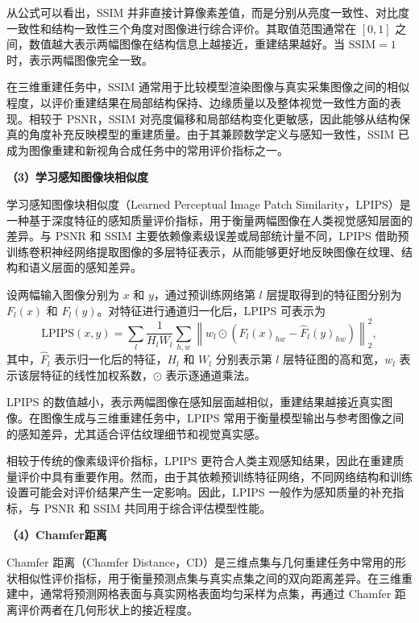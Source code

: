 从公式可以看出，SSIM 并非直接计算像素差值，而是分别从亮度一致性、对比度一致性和结构一致性三个角度对图像进行综合评价。其取值范围通常在 $[0,1]$ 之间，数值越大表示两幅图像在结构信息上越接近，重建结果越好。当 $\mathrm{SSIM}=1$ 时，表示两幅图像完全一致。

在三维重建任务中，SSIM 通常用于比较模型渲染图像与真实采集图像之间的相似程度，以评价重建结果在局部结构保持、边缘质量以及整体视觉一致性方面的表现。相较于 PSNR，SSIM 对亮度偏移和局部结构变化更敏感，因此能够从结构保真的角度补充反映模型的重建质量。由于其兼顾数学定义与感知一致性，SSIM 已成为图像重建和新视角合成任务中的常用评价指标之一。

\noindent\textbf{（3）学习感知图像块相似度}

学习感知图像块相似度（Learned Perceptual Image Patch Similarity\cite{zhang2018lpips}，LPIPS）是一种基于深度特征的感知质量评价指标，用于衡量两幅图像在人类视觉感知层面的差异。与 PSNR 和 SSIM 主要依赖像素级误差或局部统计量不同，LPIPS 借助预训练卷积神经网络提取图像的多层特征表示，从而能够更好地反映图像在纹理、结构和语义层面的感知差异。

设两幅输入图像分别为 $x$ 和 $y$，通过预训练网络第 $l$ 层提取得到的特征图分别为 $F_l(x)$ 和 $F_l(y)$。对特征进行通道归一化后，LPIPS 可表示为
\begin{equation}
\mathrm{LPIPS}(x,y) =
\sum_l \frac{1}{H_l W_l}
\sum_{h,w}
\left\|
w_l \odot
\left( \hat{F}_l(x)_{hw} - \hat{F}_l(y)_{hw} \right)
\right\|_2^2 ,
\label{eq:lpips}
\end{equation}
其中，$\hat{F}_l$ 表示归一化后的特征，$H_l$ 和 $W_l$ 分别表示第 $l$ 层特征图的高和宽，$w_l$ 表示该层特征的线性加权系数，$\odot$ 表示逐通道乘法。

LPIPS 的数值越小，表示两幅图像在感知层面越相似，重建结果越接近真实图像。在图像生成与三维重建任务中，LPIPS 常用于衡量模型输出与参考图像之间的感知差异，尤其适合评估纹理细节和视觉真实感。

相较于传统的像素级评价指标，LPIPS 更符合人类主观感知结果，因此在重建质量评价中具有重要作用。然而，由于其依赖预训练特征网络，不同网络结构和训练设置可能会对评价结果产生一定影响。因此，LPIPS 一般作为感知质量的补充指标，与 PSNR 和 SSIM 共同用于综合评估模型性能。

\noindent\textbf{（4）Chamfer距离}

Chamfer 距离（Chamfer Distance\cite{fan2017chamfer}，CD）是三维点集与几何重建任务中常用的形状相似性评价指标，用于衡量预测点集与真实点集之间的双向距离差异。在三维重建中，通常将预测网格表面与真实网格表面均匀采样为点集，再通过 Chamfer 距离评价两者在几何形状上的接近程度。

